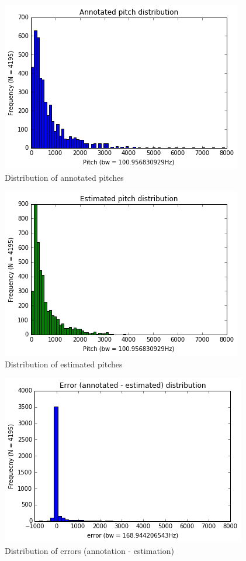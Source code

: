 \documentclass{article}
\begin{document}
\begin{figure}
    \centering
    \includegraphics[scale=0.5]{img/pTag_distribution.png}
    \caption{Distribution of annotated pitches}
    \label{fig:pTag_distr}
\end{figure}
\begin{figure}
    \centering
    \includegraphics[scale=0.5]{img/pEst_distribution.png}
    \caption{Distribution of estimated pitches}
    \label{fig:pEst_distr}
\end{figure}
\begin{figure}
    \centering
    \includegraphics[scale=0.5]{img/err_distribution.png}
    \caption{Distribution of errors (annotation - estimation)}
    \label{fig:err_distr}
\end{figure}
\end{document}
